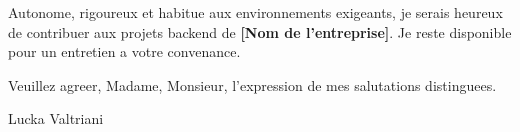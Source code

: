 \documentclass[11pt,a4paper]{article}
\newcommand{\entreprise}{[Nom de l'entreprise]}
\begin{document}
Autonome, rigoureux et habitue aux environnements exigeants, je serais heureux de contribuer aux projets backend de \textbf{\entreprise}. Je reste disponible pour un entretien a votre convenance.

\vspace{18pt}

Veuillez agreer, Madame, Monsieur, l'expression de mes salutations distinguees.

\vspace{28pt}

\noindent Lucka Valtriani
\end{document}
